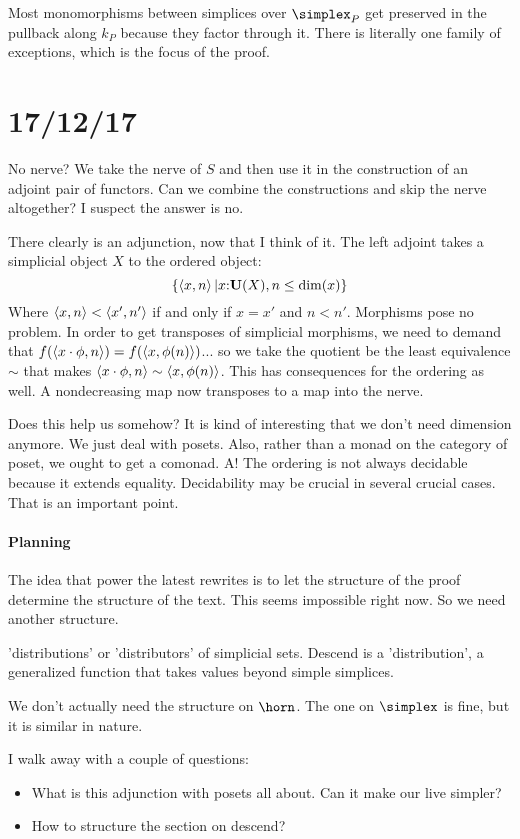 \documentclass[csh.tex]{subfiles}
\begin{document}
Most monomorphisms between simplices over $\simplex_P$ get preserved in the pullback along $k_P$ because they factor through it. There is literally one family of exceptions, which is the focus of the proof.

\section{17/12/17}
No nerve? We take the nerve of $S$ and then use it in the construction of an adjoint pair of functors. Can we combine the constructions and skip the nerve altogether? I suspect the answer is no.

There clearly is an adjunction, now that I think of it. The left adjoint takes a simplicial object $X$ to the ordered object:
\[ \left\{\left\langle x,n \right\rangle|x\mathord :\mathbf{U}(X),n\leq \dim(x)\right\} \]
Where $\left\langle x,n \right\rangle<\left\langle x',n' \right\rangle$ if and only if $x=x'$ and $n<n'$. Morphisms pose no problem.
In order to get transposes of simplicial morphisms, we need to demand that $f(\left\langle x\cdot\phi,n \right\rangle) = f(\left\langle x,\phi(n) \right\rangle)$... so we take the quotient be the least equivalence $\sim$ that makes $\left\langle x\cdot\phi,n \right\rangle\sim \left\langle x,\phi(n) \right\rangle$. This has consequences for the ordering as well. A nondecreasing map now transposes to a map into the nerve.

Does this help us somehow? It is kind of interesting that we don't need dimension anymore. We just deal with posets. Also, rather than a monad on the category of poset, we ought to get a comonad.
A! The ordering is not always decidable because it extends equality. Decidability may be crucial in several crucial cases. That is an important point.

\paragraph{Planning}
The idea that power the latest rewrites is to let the structure of the proof determine the structure of the text. This seems impossible right now. So we need another structure.

'distributions' or 'distributors' of simplicial sets. Descend is a 'distribution', a generalized function that takes values beyond simple simplices.

We don't actually need the structure on $\horn$. The one on $\simplex$ is fine, but it is similar in nature.

I walk away with a couple of questions:
\begin{itemize}
\item What is this adjunction with posets all about. Can it make our live simpler?
\item How to structure the section on descend?
\end{itemize}
\end{document}

